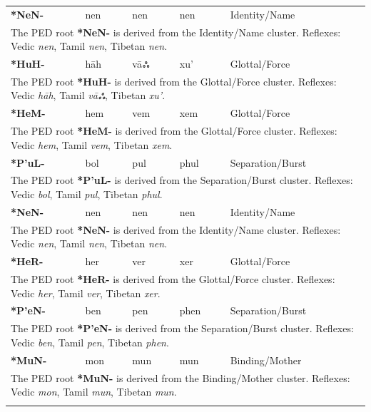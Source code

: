 \begin{longtable}{p{} p{} p{} p{} p{}}
\textbf{*NeN-} & nen & nen & nen & Identity/Name \\ 
\multicolumn{5}{p{\textwidth}}{\small The PED root \textbf{*NeN-} is derived from the Identity/Name cluster. Reflexes: Vedic \textit{nen}, Tamil \textit{nen}, Tibetan \textit{nen}. } \\ \addlinespace 
\textbf{*HuH-} & hāh & vāஃ & xu' & Glottal/Force \\ 
\multicolumn{5}{p{\textwidth}}{\small The PED root \textbf{*HuH-} is derived from the Glottal/Force cluster. Reflexes: Vedic \textit{hāh}, Tamil \textit{vāஃ}, Tibetan \textit{xu'}. } \\ \addlinespace 
\textbf{*HeM-} & hem & vem & xem & Glottal/Force \\ 
\multicolumn{5}{p{\textwidth}}{\small The PED root \textbf{*HeM-} is derived from the Glottal/Force cluster. Reflexes: Vedic \textit{hem}, Tamil \textit{vem}, Tibetan \textit{xem}. } \\ \addlinespace 
\textbf{*P'uL-} & bol & pul & phul & Separation/Burst \\ 
\multicolumn{5}{p{\textwidth}}{\small The PED root \textbf{*P'uL-} is derived from the Separation/Burst cluster. Reflexes: Vedic \textit{bol}, Tamil \textit{pul}, Tibetan \textit{phul}. } \\ \addlinespace 
\textbf{*NeN-} & nen & nen & nen & Identity/Name \\ 
\multicolumn{5}{p{\textwidth}}{\small The PED root \textbf{*NeN-} is derived from the Identity/Name cluster. Reflexes: Vedic \textit{nen}, Tamil \textit{nen}, Tibetan \textit{nen}. } \\ \addlinespace 
\textbf{*HeR-} & her & ver & xer & Glottal/Force \\ 
\multicolumn{5}{p{\textwidth}}{\small The PED root \textbf{*HeR-} is derived from the Glottal/Force cluster. Reflexes: Vedic \textit{her}, Tamil \textit{ver}, Tibetan \textit{xer}. } \\ \addlinespace 
\textbf{*P'eN-} & ben & pen & phen & Separation/Burst \\ 
\multicolumn{5}{p{\textwidth}}{\small The PED root \textbf{*P'eN-} is derived from the Separation/Burst cluster. Reflexes: Vedic \textit{ben}, Tamil \textit{pen}, Tibetan \textit{phen}. } \\ \addlinespace 
\textbf{*MuN-} & mon & mun & mun & Binding/Mother \\ 
\multicolumn{5}{p{\textwidth}}{\small The PED root \textbf{*MuN-} is derived from the Binding/Mother cluster. Reflexes: Vedic \textit{mon}, Tamil \textit{mun}, Tibetan \textit{mun}. } \\ \addlinespace 

\end{longtable}
